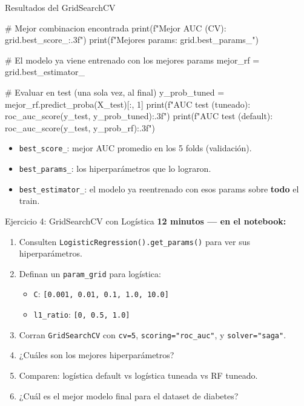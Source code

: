 \documentclass[aspectratio=169, 11pt]{beamer}
\begin{document}
\begin{frame}[fragile,shrink=10]{Resultados del GridSearchCV}
  \vspace{-4pt}
  \begin{pyblock}
# Mejor combinacion encontrada
print(f"Mejor AUC (CV): {grid.best_score_:.3f}")
print(f"Mejores params: {grid.best_params_}")

# El modelo ya viene entrenado con los mejores params
mejor_rf = grid.best_estimator_

# Evaluar en test (una sola vez, al final)
y_prob_tuned = mejor_rf.predict_proba(X_test)[:, 1]
print(f"AUC test (tuneado): {roc_auc_score(y_test, y_prob_tuned):.3f}")
print(f"AUC test (default): {roc_auc_score(y_test, y_prob_rf):.3f}")
  \end{pyblock}

  \vspace{6pt}
  {\scriptsize\color{arcaDark}
  \begin{itemize}\setlength{\itemsep}{3pt}
    \item[{\color{arcaRed}\scriptsize\faArrowRight}]
      \texttt{best\_score\_}: mejor AUC promedio en los 5 folds (validación).
    \item[{\color{arcaRed}\scriptsize\faArrowRight}]
      \texttt{best\_params\_}: los hiperparámetros que lo lograron.
    \item[{\color{arcaRed}\scriptsize\faArrowRight}]
      \texttt{best\_estimator\_}: el modelo ya reentrenado con esos params
      sobre \textbf{todo} el train.
  \end{itemize}
  }
\end{frame}

\begin{frame}[shrink=5]{Ejercicio 4: GridSearchCV con Logística}
  \vspace{-4pt}
  {\footnotesize\color{arcaDark}\bfseries
    \faClock\hspace{4pt} 12 minutos --- en el notebook:}

  \vspace{6pt}
  {\footnotesize
  \begin{enumerate}\setlength{\itemsep}{4pt}
    \item Consulten \texttt{LogisticRegression().get\_params()} para ver
      sus hiperparámetros.
    \item Definan un \texttt{param\_grid} para logística:
      \begin{itemize}
        \item \texttt{C}: \texttt{[0.001, 0.01, 0.1, 1.0, 10.0]}
        \item \texttt{l1\_ratio}: \texttt{[0, 0.5, 1.0]}
      \end{itemize}
    \item Corran \texttt{GridSearchCV} con \texttt{cv=5}, \texttt{scoring="roc\_auc"},
      y \texttt{solver="saga"}.
    \item ¿Cuáles son los mejores hiperparámetros?
    \item Comparen: logística default vs logística tuneada vs RF tuneado.
    \item ¿Cuál es el mejor modelo final para el dataset de diabetes?
  \end{enumerate}
  }
\end{frame}
\end{document}
